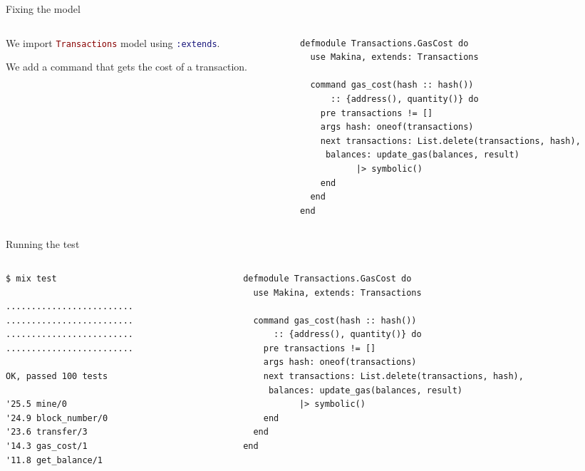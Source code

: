 \documentclass[aspectratio=169, 10pt, handout]{beamer}
\begin{document}
\begin{frame}[label={sec:org153fd9e},fragile]{Fixing the model}
 \begin{columns}
\begin{column}{0.38\columnwidth}
We import \lstinline[language=elixir, style=display]~Transactions~ model using \lstinline[language=elixir, style=display]~:extends~.

\vspace{10pt}

We add a command that gets the cost of a transaction.
\end{column}

\begin{column}{0.58\columnwidth}
\lstset{language=elixir,label= ,caption= ,captionpos=b,numbers=none,style=display}
\begin{lstlisting}
defmodule Transactions.GasCost do
  use Makina, extends: Transactions

  command gas_cost(hash :: hash())
      :: {address(), quantity()} do
    pre transactions != []
    args hash: oneof(transactions)
    next transactions: List.delete(transactions, hash),
	 balances: update_gas(balances, result)
		   |> symbolic()
    end
  end
end
\end{lstlisting}
\end{column}
\end{columns}
\end{frame}

\begin{frame}[label={sec:orgf18b261},fragile]{Running the test}
 \begin{columns}
\begin{column}{0.38\columnwidth}
\lstset{language=bash,label= ,caption= ,captionpos=b,numbers=none,style=shell}
\begin{lstlisting}
$ mix test

.........................
.........................
.........................
.........................

OK, passed 100 tests

'25.5 mine/0
'24.9 block_number/0
'23.6 transfer/3
'14.3 gas_cost/1
'11.8 get_balance/1
\end{lstlisting}
\end{column}

\begin{column}{0.58\columnwidth}
\lstset{language=elixir,label= ,caption= ,captionpos=b,numbers=none,style=display}
\begin{lstlisting}
defmodule Transactions.GasCost do
  use Makina, extends: Transactions

  command gas_cost(hash :: hash())
      :: {address(), quantity()} do
    pre transactions != []
    args hash: oneof(transactions)
    next transactions: List.delete(transactions, hash),
	 balances: update_gas(balances, result)
		   |> symbolic()
    end
  end
end
\end{lstlisting}
\end{column}
\end{columns}
\end{frame}
\end{document}
